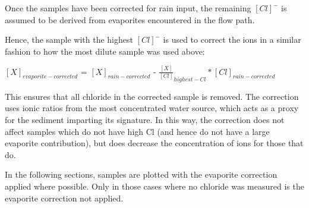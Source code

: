 \bsk

Once the samples have been corrected for rain input, the remaining $[Cl]^{-}$ is assumed to be derived from evaporites encountered in the flow path.

\bsk

Hence, the sample with the highest $[Cl]^{-}$ is used to correct the ions in a similar fashion to how the most dilute sample was used above:

\begin{center}
{\Large
$[X]_{evaporite-corrected}$  = $[X]_{rain-corrected}$ - $\frac{[X]}{[Cl]}_{highest-Cl} * [Cl]_{rain-corrected}$}
\end{center}

This ensures that all chloride in the corrected sample is removed. The correction uses ionic ratios from the most concentrated water source, which acts as a proxy for the sediment imparting its signature.  In this way, the correction does not affect samples which do not have high Cl (and hence do not have a large evaporite contribution), but does decrease the concentration of ions for those that do.

\bsk

In the following sections, samples are plotted with the evaporite correction applied where possible. Only in those cases where no chloride was measured is the evaporite correction not applied.


\bsk




